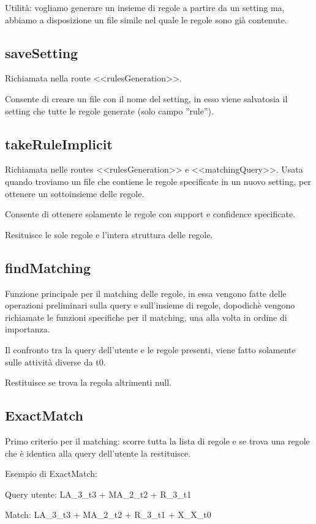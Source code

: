 \documentclass{article}
\begin{document}
Utilità: vogliamo generare un insieme di regole a partire da un setting ma, abbiamo a disposizione un file simile nel quale le regole sono già contenute.

\subsection{saveSetting}
Richiamata nella route <<rulesGeneration>>.

Consente di creare un file con il nome del setting, in esso viene salvatosia il setting che tutte le regole generate (solo campo ''rule'').

\subsection{takeRuleImplicit}
Richiamata nelle routes <<rulesGeneration>> e <<matchingQuery>>. Usata quando troviamo un file che contiene le regole specificate in un nuovo setting, per ottenere un sottoinsieme delle regole.

Consente di ottenere solamente le regole con support e confidence specificate.

Resituisce le sole regole e l'intera struttura delle regole.

\subsection{findMatching}
Funzione principale per il matching delle regole, in essa vengono fatte delle operazioni preliminari sulla query e sull'insieme di regole, dopodichè vengono richiamate le funzioni specifiche per il matching, una alla volta in ordine di importanza.

Il confronto tra la query dell'utente e le regole presenti, viene fatto solamente sulle attività diverse da t0.

Restituisce se trova la regola altrimenti null.

\subsection{ExactMatch}
Primo criterio per il matching: scorre tutta la lista di regole e se trova una regole che è identica alla query dell'utente la restituisce. 

Esempio di ExactMatch: 

Query utente: LA\_3\_t3 + MA\_2\_t2 + R\_3\_t1

Match: LA\_3\_t3 + MA\_2\_t2 + R\_3\_t1 + X\_X\_t0
\end{document}

